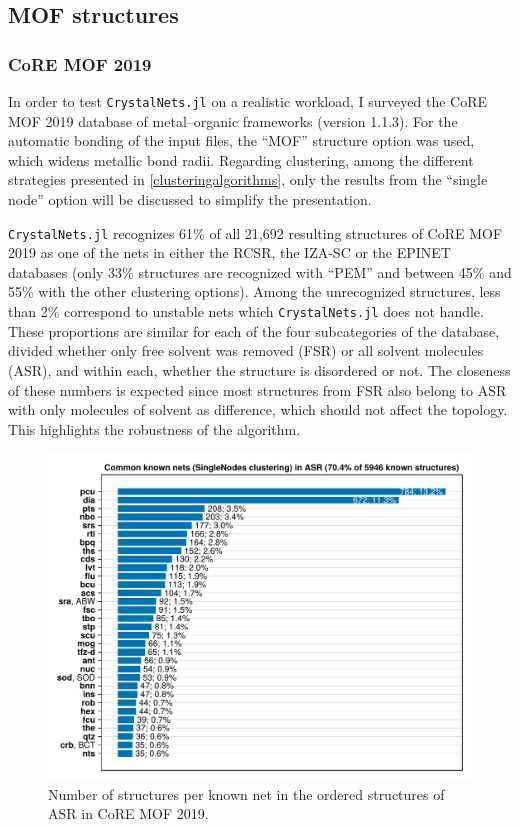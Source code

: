 \documentclass[main.tex]{subfiles}
\begin{document}


\subsection{MOF structures}

\subsubsection{CoRE MOF 2019}

In order to test \texttt{CrystalNets.jl} on a realistic workload, I surveyed the CoRE MOF 2019 \autocite{CoREMOF} database of metal--organic frameworks (version 1.1.3). For the automatic bonding of the input files, the ``MOF'' structure option was used, which widens metallic bond radii. Regarding clustering, among the different strategies presented in \cref{clusteringalgorithms}, only the results from the ``single node'' option will be discussed to simplify the presentation.

\texttt{CrystalNets.jl} recognizes {61\%} of all 21,692 resulting structures of CoRE MOF 2019 as one of the nets in either the RCSR, the IZA-SC or the EPINET databases (only {33\%} structures are recognized with ``PEM'' and between {45\%} and {55\%} with the other clustering options). Among the unrecognized structures, less than {2\%} correspond to unstable nets which \texttt{CrystalNets.jl} does not handle.
These proportions are similar for each of the four subcategories of the database, divided whether only free solvent was removed (FSR) or all solvent molecules (ASR), and within each, whether the structure is disordered or not. The closeness of these numbers is expected since most structures from FSR also belong to ASR with only molecules of solvent as difference, which should not affect the topology. This highlights the robustness of the algorithm.

\begin{figure}
	\centering
	\includegraphics[width=\linewidth]{figures/topology/CoREMOF2019.pdf}
	\caption{Number of structures per known net in the ordered structures of ASR in CoRE MOF 2019\autocite{CoREMOF}.}
	\label{numstructpernet}
\end{figure}
\end{document}
